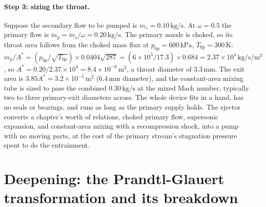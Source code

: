 \paragraph{Step 3: sizing the throat.} Suppose the secondary flow to be
pumped is $\dot m_s = 0.10\,\si{\kilogram\per\second}$. At
$\omega = 0.5$ the primary flow is $\dot m_p = \dot m_s/\omega =
0.20\,\si{\kilogram\per\second}$. The primary nozzle is choked, so its
throat area follows from the choked mass flux at
$p_{0p} = 600\,\text{kPa}$, $T_{0p} = 300\,\si{\kelvin}$:
$\dot m_p/A^* = (p_{0p}/\sqrt{T_{0p}})\times 0.0404\sqrt{287} =
(6\times 10^{5}/17.3)\times 0.684 = 2.37\times 10^{4}\,\si{\kilogram\per
\second}/\si{\meter}^2$, so $A^* = 0.20/2.37\times 10^{4} =
8.4\times 10^{-6}\,\si{\meter}^2$, a throat diameter of
$3.3\,\si{\milli\meter}$. The exit area is $3.85 A^* =
3.2\times 10^{-5}\,\si{\meter}^2$ ($6.4\,\si{\milli\meter}$ diameter),
and the constant-area mixing tube is sized to pass the combined
$0.30\,\si{\kilogram\per\second}$ at the mixed Mach number, typically
two to three primary-exit diameters across. The whole device fits in a
hand, has no seals or bearings, and runs as long as the primary supply
holds. The ejector converts a chapter's worth of relations, choked
primary flow, supersonic expansion, and constant-area mixing with a
recompression shock, into a pump with no moving parts, at the cost of
the primary stream's stagnation pressure spent to do the entrainment.

\section{Deepening: the Prandtl-Glauert transformation and its
breakdown}

